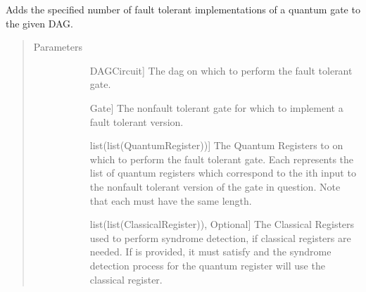 \documentclass[letterpaper,10pt,english]{sphinxmanual}
\begin{document}
\begin{fulllineitems}
\begin{fulllineitems}
\begin{quote}
\begin{description}
\begin{description}
\end{description}

\end{description}\end{quote}

\end{fulllineitems}


\begin{fulllineitems}
\label{\detokenize{Base:BaseFaultTolerance.FaultTolerantGates.addGateDag}}
\sphinxAtStartPar
Adds the specified number of fault tolerant implementations of a quantum gate to the given DAG.
\begin{quote}\begin{description}
\item[{Parameters}] \leavevmode\begin{description}
\item[{}] \leavevmode{[}DAGCircuit{]}
\sphinxAtStartPar
The dag on which to perform the fault tolerant gate.

\item[{}] \leavevmode{[}Gate{]}
\sphinxAtStartPar
The non\sphinxhyphen{}fault tolerant gate for which to implement a fault tolerant version.

\item[{}] \leavevmode{[}list(list(QuantumRegister)){]}
\sphinxAtStartPar
The Quantum Registers to on which to perform the fault tolerant gate. Each  represents the list of quantum registers which correspond to the ith input to the non\sphinxhyphen{}fault tolerant version of the gate in question. Note that each  must have the same length.

\item[{}] \leavevmode{[}list(list(ClassicalRegister)), Optional{]}
\sphinxAtStartPar
The Classical Registers used to perform syndrome detection, if classical registers are needed. If  is provided, it must satisfy  and the syndrome detection process for the  quantum register will use the  classical register.


\end{description}
\end{description}
\end{quote}
\end{fulllineitems}
\end{fulllineitems}
\end{document}
